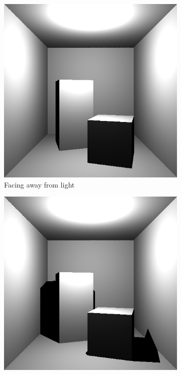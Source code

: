 \documentclass[a4paper,11pt]{article}
\begin{document}
\begin{figure}[h!]
	\centering
	\begin{subfigure}[h]{0.3\linewidth}
		\centering
		\includegraphics[width=\linewidth]{screenshot2.png}
		\caption{Facing away from light}
		\label{fig2}
	\end{subfigure}
	\begin{subfigure}[h!]{0.3\linewidth}
		\centering
		\includegraphics[width=\linewidth]{screenshot25.png}

\end{subfigure}
\end{figure}
\end{document}
